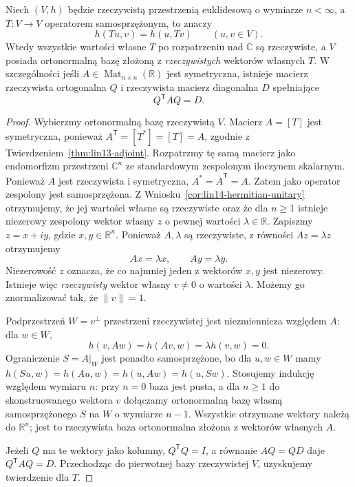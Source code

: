\begin{twierdzenie}
\label{thm:lin14-real-spectral}
Niech \((V,h)\) będzie rzeczywistą przestrzenią
euklidesową o wymiarze \(n<\infty\),
a \(T\colon V\to V\) operatorem samosprzężonym,
to znaczy
\[
 h(Tu,v)=h(u,Tv)
 \qquad(u,v\in V).
\]
Wtedy wszystkie wartości własne \(T\)
po rozpatrzeniu nad \(\mathbb C\) są
rzeczywiste, a \(V\) posiada
ortonormalną bazę złożoną z
\emph{rzeczywistych} wektorów własnych \(T\).
W szczególności jeśli
\(A\in\operatorname{Mat}_{n\times n}(\mathbb R)\)
jest symetryczna, istnieje
macierz rzeczywista ortogonalna \(Q\)
i rzeczywista macierz diagonalna \(D\)
spełniające
\[
 Q^{\mathsf T}AQ=D.
\]
\end{twierdzenie}
\begin{proof}
Wybierzmy ortonormalną bazę rzeczywistą \(V\).
Macierz \(A=[T]\) jest symetryczna,
ponieważ
\(A^{\mathsf T}=[T^*]=[T]=A\),
zgodnie z
Twierdzeniem~\ref{thm:lin13-adjoint}.
Rozpatrzmy tę samą macierz
jako endomorfizm przestrzeni
\(\mathbb C^n\) ze standardowym
zespolonym iloczynem skalarnym.
Ponieważ \(A\) jest rzeczywista
i symetryczna,
\(A^*=\overline A^{\mathsf T}=A\).
Zatem jako operator zespolony
jest samosprzężona.
Z
Wniosku~\ref{cor:lin14-hermitian-unitary}
otrzymujemy, że jej wartości własne
są rzeczywiste oraz że dla \(n\ge1\)
istnieje niezerowy zespolony
wektor własny \(z\) o pewnej
wartości \(\lambda\in\mathbb R\).
Zapiszmy \(z=x+iy\),
gdzie \(x,y\in\mathbb R^n\).
Ponieważ \(A,\lambda\) są rzeczywiste,
z równości \(Az=\lambda z\)
otrzymujemy
\[
 Ax=\lambda x,\qquad
 Ay=\lambda y.
\]
Niezerowość \(z\) oznacza,
że co najmniej jeden z
wektorów \(x,y\) jest niezerowy.
Istnieje więc \emph{rzeczywisty}
wektor własny \(v\ne0\)
o wartości \(\lambda\).
Możemy go znormalizować
tak, że \(\|v\|=1\).

Podprzestrzeń \(W=v^\perp\)
przestrzeni rzeczywistej
jest niezmiennicza względem \(A\):
dla \(w\in W\),
\[
 h(v,Aw)=h(Av,w)
       =\lambda h(v,w)=0.
\]
Ograniczenie \(S=A|_W\)
jest ponadto samosprzężone,
bo dla \(u,w\in W\)
mamy
\(h(Su,w)=h(Au,w)=h(u,Aw)=h(u,Sw)\).
Stosujemy indukcję względem
wymiaru \(n\): przy \(n=0\)
baza jest pusta, a dla \(n\ge1\)
do skonstruowanego wektora \(v\)
dołączamy ortonormalną bazę
własną samosprzężonego \(S\)
na \(W\) o wymiarze \(n-1\).
Wszystkie otrzymane wektory
należą do \(\mathbb R^n\);
jest to rzeczywista baza
ortonormalna złożona z
wektorów własnych \(A\).

Jeżeli \(Q\) ma te wektory
jako kolumny,
\(Q^{\mathsf T}Q=I\),
a równanie \(AQ=QD\)
daje \(Q^{\mathsf T}AQ=D\).
Przechodząc do pierwotnej
bazy rzeczywistej \(V\),
uzyskujemy twierdzenie dla \(T\).
\end{proof}

